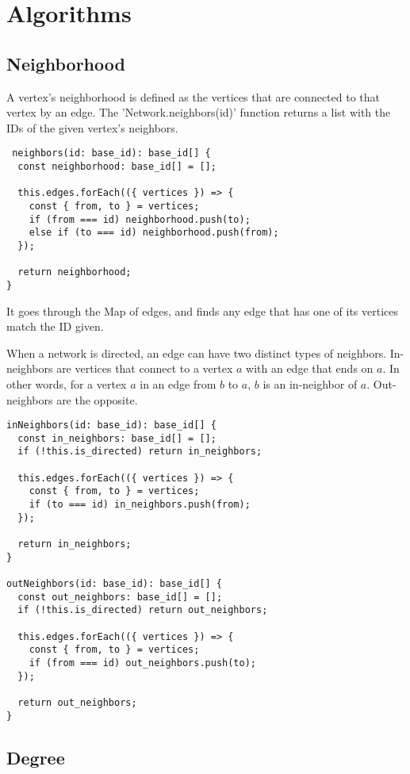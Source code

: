 \chapter{Algorithms}

\section{Neighborhood}
A vertex's neighborhood is defined as the vertices that are connected to that vertex by an edge.
The 'Network.neighbors(id)' function returns a list with the IDs of the given vertex's neighbors. 

\begin{verbatim}
 neighbors(id: base_id): base_id[] {
  const neighborhood: base_id[] = [];

  this.edges.forEach(({ vertices }) => {
    const { from, to } = vertices;
    if (from === id) neighborhood.push(to);
    else if (to === id) neighborhood.push(from);
  });

  return neighborhood;
}
\end{verbatim}

It goes through the Map of edges, and finds any edge that has one of its vertices match the ID given.

When a network is directed, an edge can have two distinct types of neighbors.
In-neighbors are vertices that connect to a vertex $a$ with an edge that ends on $a$.
In other words, for a vertex $a$ in an edge from $b$ to $a$, $b$ is an in-neighbor of $a$.
Out-neighbors are the opposite.

\begin{verbatim}
inNeighbors(id: base_id): base_id[] {
  const in_neighbors: base_id[] = [];
  if (!this.is_directed) return in_neighbors;

  this.edges.forEach(({ vertices }) => {
    const { from, to } = vertices;
    if (to === id) in_neighbors.push(from);
  });

  return in_neighbors;
}

outNeighbors(id: base_id): base_id[] {
  const out_neighbors: base_id[] = [];
  if (!this.is_directed) return out_neighbors;

  this.edges.forEach(({ vertices }) => {
    const { from, to } = vertices;
    if (from === id) out_neighbors.push(to);
  });

  return out_neighbors;
}
\end{verbatim}

\section{Degree}

